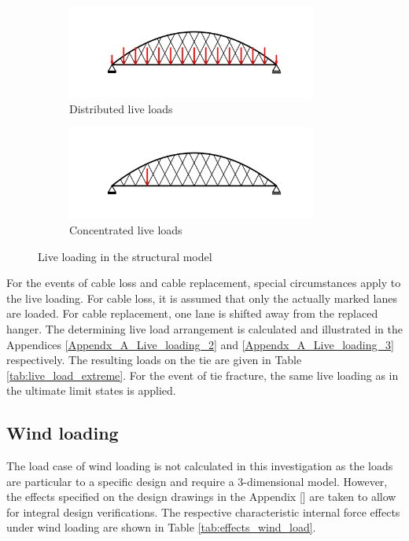 \begin{figure}[H]
\centering
\begin{subfigure}{0.5\textwidth}
    \centering
    \includegraphics[trim={0 0.8cm 0 0.8cm},clip, width=0.9\textwidth]{illustrations/figures/distributed live loads.png}
    \caption{Distributed live loads}
    \label{fig:Live_load_1}
\end{subfigure}%
\begin{subfigure}{.5\textwidth}
    \centering
    \includegraphics[trim={0 0.8cm 0 0.8cm},clip, width=0.9\textwidth]{illustrations/figures/concentrated live loads.png}
    \caption{Concentrated live loads}
    \label{fig:Live_load_2}
\end{subfigure}
\caption{Live loading in the structural model}
\label{fig:Live_load}
\end{figure}

For the events of cable loss and cable replacement, special circumstances apply to the live loading. For cable loss, it is assumed that only the actually marked lanes are loaded. For cable replacement, one lane is shifted away from the replaced hanger. The determining live load arrangement is calculated and illustrated in the Appendices \ref{Appendx_A_Live_loading_2} and \ref{Appendx_A_Live_loading_3} respectively. The resulting loads on the tie are given in Table \ref{tab:live_load_extreme}. For the event of tie fracture, the same live loading as in the ultimate limit states is applied.




\subsection{Wind loading}
The load case of wind loading is not calculated in this investigation as the loads are particular to a specific design and require a 3-dimensional model. However, the effects specified on the design drawings in the Appendix [] are taken to allow for integral design verifications. The respective characteristic internal force effects under wind loading are shown in Table \ref{tab:effects_wind_load}.

